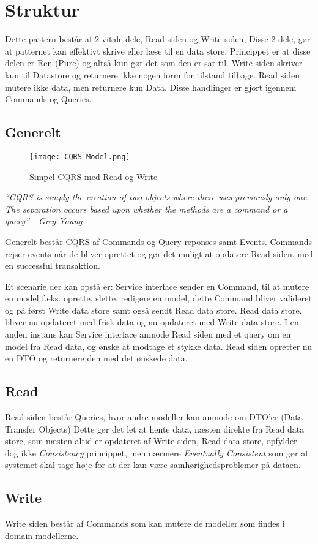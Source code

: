 \section{Struktur}

Dette pattern består af 2 vitale dele, Read siden og Write siden, Disse 2 dele, gør at patternet kan effektivt skrive eller læse til en data store. Princippet er at disse delen er Ren (Pure) og altså kun gør det som den er sat til. Write siden skriver kun til Datastore og returnere ikke nogen form for tilstand tilbage. Read siden mutere ikke data, men returnere kun Data. Disse handlinger er gjort igennem Commands og Queries.

\subsection{Generelt}

\begin{figure}[H]
	\center
	\texttt{[image: CQRS-Model.png]}
	\caption{Simpel CQRS med Read og Write}
	\label{fig:cqrs-model}
\end{figure}

\textit{``CQRS is simply the creation of two objects where there was previously only one. The separation occurs based upon whether the methods are a command or a query'' - Greg Young}

Generelt består CQRS af Commands og Query reponses samt Events. Commands rejser events når de bliver oprettet og gør det muligt at opdatere Read siden, med en successful transaktion.

Et scenarie der kan opstå er: Service interface sender en Command, til at mutere en model f.eks. oprette, slette, redigere en model, dette Command bliver valideret og på først Write data store samt også sendt Read data store. Read data store, bliver nu opdateret med frisk data og nu opdateret med Write data store. I en anden instans kan Service interface anmode Read siden med et query om en model fra Read data, og ønske at modtage et stykke data. Read siden opretter nu en DTO og returnere den med det ønskede data. 
\subsection{Read}

Read siden består Queries, hvor andre modeller kan anmode om DTO'er (Data Transfer Objects) Dette gør det let at hente data, næsten direkte fra Read data store, som næsten altid er opdateret af Write siden, Read data store, opfylder dog ikke \textit{Consistency} princippet, men nærmere \textit{Eventually Consistent} som gør at systemet skal tage høje for at der kan være samhørighedsproblemer på dataen. 
\subsection{Write}

Write siden består af Commands som kan mutere de modeller som findes i domain modellerne. 



